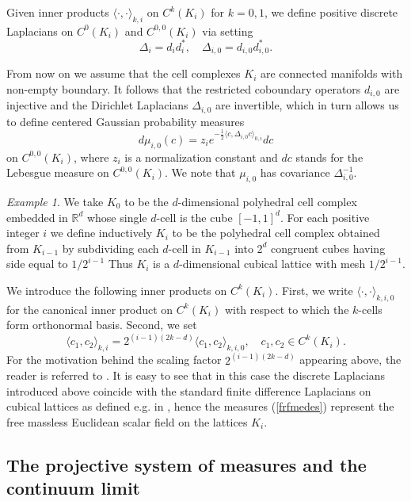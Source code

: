 \documentclass[11pt,reqno]{amsart}
\numberwithin{equation}{section}
\theoremstyle{remark}
\newtheorem{example}[theorem]{Example}
\theoremstyle{rmdefinition}
\begin{document}
Given inner products $\langle \cdot, \cdot \rangle_{k,i}$ on $C^{k}(K_i)$ for $k=0,1$, we define positive discrete Laplacians on $C^{0}(K_i)$ and $C^{0,0}(K_i)$ via setting
$$ \Delta_i=d_id^*_i  ,\quad \Delta_{i,0}=d_{i,0}d^*_{i,0}.$$

From now on we assume that the cell complexes $K_i$ are connected manifolds with non-empty boundary. It follows that the restricted coboundary operators $d_{i,0}$ are injective and the Dirichlet Laplacians $\Delta_{i,0}$ are invertible, which in turn allows us to define centered Gaussian probability measures
\begin{equation}\label{frfmedes}
d\mu_{i,0}(c)=z_i e^{-\frac{1}{2}\langle c, \Delta_{i,0} c\rangle _{0,i}} d c
\end{equation}
on $C^{0,0}(K_i)$, where $z_i$ is a normalization constant and $dc$ stands for the Lebesgue measure on $C^{0,0}(K_i)$. 
We note that $\mu_{i,0}$ has covariance  $\Delta^{-1}_{i,0}$.

\begin{example}\label{cubexam}
We take $K_0$ to be the $d$-dimensional polyhedral cell complex embedded in $\mathbb{R}^d$ whose single $d$-cell is the cube $[-1,1]^d$. For each positive integer $i$ we define inductively $K_i$ to be the polyhedral cell complex obtained from $K_{i-1}$ by subdividing each $d$-cell in $K_{i-1}$ into $2^d$ congruent cubes having side equal to $1/2^{i-1}$ Thus $K_i$ is a $d$-dimensional cubical lattice with mesh $1/2^{i-1}$.

We introduce the following inner products on $C^{k}(K_i)$. First, we write $\langle \cdot, \cdot \rangle_{k,i,0}$ for the canonical inner product on $C^{k}(K_i)$ with respect to which the $k$-cells form orthonormal basis. Second, we set
\begin{equation}\label{defscalinnp}
	\langle c_1, c_2 \rangle_{k,i}= 2^{(i-1)(2k-d)} \langle c_1, c_2 \rangle_{k,i,0}, \quad c_1,c_2 \in 
	C^{k}(K_i).
\end{equation}
For the motivation behind the scaling factor $2^{(i-1)(2k-d)}$ appearing above, the reader is referred to \cite[Lemma 7.22]{DP}. It is easy to see that in this case the discrete Laplacians introduced above coincide with the standard finite difference Laplacians on cubical lattices as defined e.g. in \cite[Section 9.5]{GJ}, hence the measures (\ref{frfmedes}) represent the free massless Euclidean scalar field on the lattices $K_i$.
\end{example}

\subsection{The projective system of measures and the continuum limit} 
\end{document}
